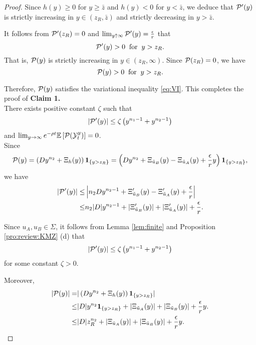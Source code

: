\documentclass[a4paper,report, 11pt]{article}
\def\e{\epsilon}
\begin{document}
\begin{proof}
Since $h(y)\ge 0$ for $y\ge \bar{z}$ and $h(y)<0$ for $y<\bar{z}$, we deduce that ${\cal P}'(y)$ is strictly increasing in $y\in(z_R,\bar{z})$ and strictly decreasing in $y>\bar{z}$. 

It follows from ${\cal P}'(z_R)=0$ and $\lim_{y\uparrow \infty}{\cal P}'(y)=\frac{\e}{r}$ that 
$$
{\cal P}'(y)>0\;\;\mbox{for}\;\;y>z_R. 
$$
That is, ${\cal P}(y)$ is strictly increasing in $y\in(z_R,\infty)$. Since ${\cal P}(z_R)=0$, we have 
$$
{\cal P}(y)>0\;\;\mbox{for}\;\;y>z_R. 
$$	

Therefore, ${\cal P}(y)$ satisfies the variational inequality \eqref{eq:VI}. This completes the proof of {\bf Claim 1. }\\

 There exists positive constant $\zeta$ such that 
\begin{equation*}
|{\cal P}'(y)|\le \zeta \left(y^{n_1-1}+y^{n_2-1}\right)
\end{equation*}
and $\lim_{y\to\infty} e^{-\rho t} \mathbb{E}\left[{\cal P}({\cal Y}_t^y)\right]=0$. \\

 Since
\begin{equation*}
{\cal P}(y) = \left(Dy^{n_2} +\Xi_h(y)\right){\bf 1}_{\{y>z_R\}}=\left(Dy^{n_2} +\Xi_{\tilde{u}_B}(y)-\Xi_{\tilde{u}_A}(y)+\dfrac{\e}{r}y\right){\bf 1}_{\{y>z_R\}},
\end{equation*}
we have
\begin{align*}
|{\cal P}'(y)|\le & \left|n_2 Dy^{n_2-1} +\Xi_{\tilde{u}_B}'(y)-\Xi_{\tilde{u}_A}'(y)+\dfrac{\e}{r} \right|\\
\le & n_2|D|y^{n_2-1}+|\Xi_{\tilde{u}_B}'(y)|+|\Xi_{\tilde{u}_A}'(y)|+\dfrac{\e}{r}.\nonumber
\end{align*}

Since $u_A, u_B\in\Sigma$, it follows from Lemma \ref{lem:finite} and Proposition \ref{pro:review:KMZ} (d) that 
\begin{equation*}
|{\cal P}'(y)|\le \zeta \left(y^{n_1-1}+y^{n_2-1}\right)
\end{equation*}
for some constant $\zeta>0$. 

	
	Moreover, 
	\begin{align*}
	|{\cal P}(y)| =& |\left(Dy^{n_2} +\Xi_h(y)\right){\bf 1}_{\{y>z_R\}}|\nonumber\\
	\le&|D|y^{n_2}{\bf 1}_{\{y>z_R\}} +|\Xi_{\tilde{u}_A}(y)|+|\Xi_{\tilde{u}_B}(y)|+\dfrac{\e}{r}y.\\
	\le&|D|z_R^{n_2} +|\Xi_{\tilde{u}_A}(y)|+|\Xi_{\tilde{u}_B}(y)|+\dfrac{\e}{r}y.\nonumber
	\end{align*}
	

\end{proof}
\end{document}
